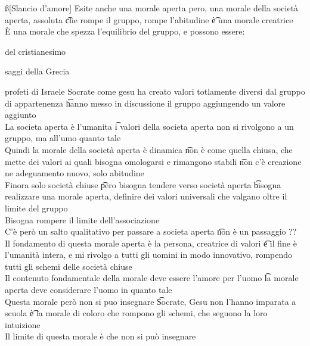 \documentclass[12pt]{article}
\begin{document}
\ss[Slancio d'amore]
Esite anche una morale aperta pero, una morale della società aperta, assoluta \t che rompe il gruppo, rompe l'abitudine \t è una morale creatrice \\
È una morale che spezza l'equilibrio del gruppo, e possono essere:
\bi
\item del cristianesimo
\item saggi della Grecia
\item profeti di Israele
\ei
Socrate come gesu ha creato valori totlamente diversi dal gruppo di appartenenza \t hanno messo in discussione il gruppo aggiungendo un valore aggiunto \\
La societa aperta è l'umanita \t i valori della societa aperta non si rivolgono a un gruppo, ma all'umo quanto tale \\
Quindi la morale della società aperta è dinamica \t non è come quella chiusa, che mette dei valori ai quali bisogna omologarsi e rimangono stabili \t non c'è creazione ne adeguamento nuovo, solo abitudine \\
Finora solo società chiuse \t pero bisogna tendere verso società aperta \t bisogna realizzare una morale aperta, definire dei valori universali che valgano oltre il limite del gruppo \\
Bisogna rompere il limite dell'associazione \\
C'è però un salto qualitativo per passare a societa aperta \t non è un passaggio ?? \\
Il fondamento di questa morale aperta è la persona, creatrice di valori \t e il fine è l'umanità intera, e mi rivolgo a tutti gli uomini in modo innovativo, rompendo tutti gli schemi delle società chiuse \\
Il contenuto fondamentale della morale deve essere l'amore per l'uomo \t la morale aperta deve considerare l'uomo in quanto tale \\
Questa morale però non si puo insegnare \t Socrate, Gesu non l'hanno imparata a scuola \t è la morale di coloro che rompono gli schemi, che seguono la loro intuizione \\
Il limite di questa morale è che non si può insegnare
\end{document}
